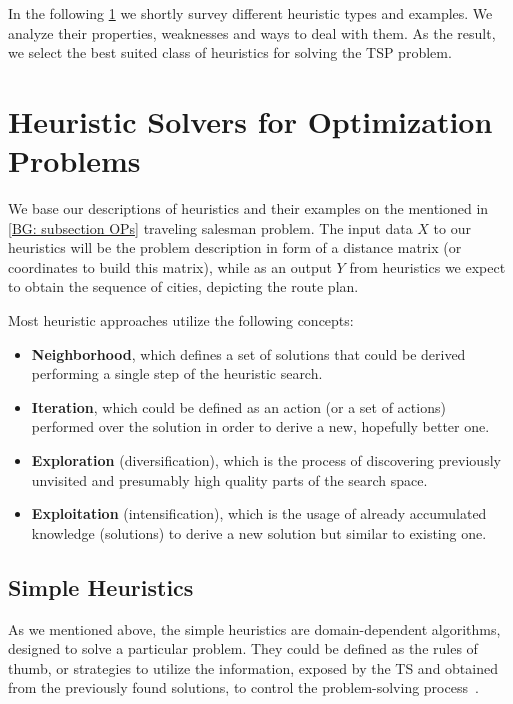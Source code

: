 In the following \cref{bg: section heuristics} we shortly survey different heuristic types and examples. We analyze their properties, weaknesses and ways to deal with them. As the result, we select the best suited class of heuristics for solving the TSP problem.

\section{Heuristic Solvers for Optimization Problems}\label{bg: section heuristics}
We base our descriptions of heuristics and their examples on the mentioned in \cref{BG: subsection OPs} traveling salesman problem. The input data $X$ to our heuristics will be the problem description in form of a distance matrix (or coordinates to build this matrix), while as an output $Y$ from heuristics we expect to obtain the sequence of cities, depicting the route plan.


Most heuristic approaches utilize the following concepts:
\begin{itemize}
	\item \textbf{Neighborhood}, which defines a set of solutions that could be derived performing a single step of the heuristic search.
	\item \textbf{Iteration}, which could be defined as an action (or a set of actions) performed over the solution in order to derive a new, hopefully better one.
	\item \textbf{Exploration} (diversification), which is the process of discovering previously unvisited and presumably high quality parts of the search space.
	\item \textbf{Exploitation} (intensification), which is the usage of already accumulated knowledge (solutions) to derive a new solution but similar to existing one.
\end{itemize}


\subsection{Simple Heuristics}
As we mentioned above, the simple heuristics are domain-dependent algorithms, designed to solve a particular problem.
They could be defined as the rules of thumb, or strategies to utilize the information, exposed by the TS and obtained from the previously found solutions, to control the problem-solving process~\cite{pearl1984intelligent}. 


